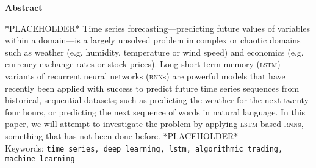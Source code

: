 \begin{center}
  \textbf{Abstract}

  \vspace{5mm}

  \small\parbox{0.8\textwidth}{
    *PLACEHOLDER* Time series forecasting---predicting future values of variables within a domain---is a largely unsolved problem in complex or chaotic domains such as weather (e.g. humidity, temperature or wind speed) and economics (e.g. currency exchange rates or stock prices). Long short-term memory (\textsc{lstm}) variants of recurrent neural networks (\textsc{rnn}s) are powerful models that have recently been applied with success to predict future time series sequences from historical, sequential datasets; such as predicting the weather for the next twenty-four hours, or predicting the next sequence of words in natural language. In this paper, we will attempt to investigate the problem by applying \textsc{lstm}-based \textsc{rnn}s, something that has not been done before. *PLACEHOLDER*\\

    Keywords: \texttt{time series, deep learning, lstm, algorithmic trading, machine learning}
  }
\end{center}
